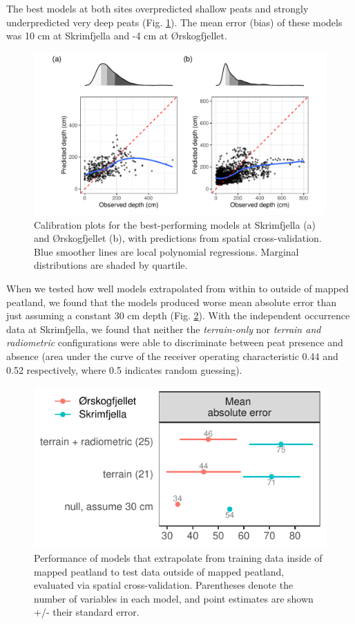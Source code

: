 \documentclass[soil, manuscript]{copernicus}
\begin{document}
The best models at both sites overpredicted shallow peats and strongly underpredicted very deep peats (Fig. \ref{fig:calPlots}).
The mean error (bias) of these models was 10 cm at Skrimfjella and -4 cm at Ørskogfjellet.

\begin{figure}
\centering
\includegraphics{figures/calibration_plots.pdf}
\caption{\label{fig:calPlots}Calibration plots for the best-performing models at Skrimfjella (a) and Ørskogfjellet (b), with predictions from spatial cross-validation. Blue smoother lines are local polynomial regressions. Marginal distributions are shaded by quartile.}
\end{figure}

When we tested how well models extrapolated from within to outside of mapped peatland, we found that the models produced worse mean absolute error than just assuming a constant 30 cm depth (Fig. \ref{fig:modelMetricsExtrapolation}).
With the independent occurrence data at Skrimfjella, we found that neither the \emph{terrain-only} nor \emph{terrain and radiometric} configurations were able to discriminate between peat presence and absence (area under the curve of the receiver operating characteristic 0.44 and 0.52 respectively, where 0.5 indicates random guessing).

\begin{figure}
\centering
\includegraphics{figures/modelmetrics-extrapolation.pdf}
\caption{\label{fig:modelMetricsExtrapolation}Performance of models that extrapolate from training data inside of mapped peatland to test data outside of mapped peatland, evaluated via spatial cross-validation. Parentheses denote the number of variables in each model, and point estimates are shown +/- their standard error.}
\end{figure}
\end{document}
